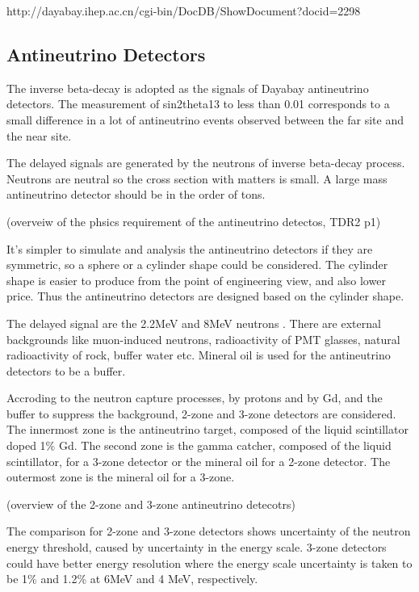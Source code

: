 http://dayabay.ihep.ac.cn/cgi-bin/DocDB/ShowDocument?docid=2298

\subsection{Antineutrino Detectors}


The inverse beta-decay is adopted as the signals of Dayabay antineutrino detectors.
The measurement of sin2theta13 to less than 0.01 corresponds to a small
difference in a lot of antineutrino events observed between the far site and
the near site.

The delayed signals are generated by the neutrons of inverse beta-decay process.
Neutrons are neutral so the cross section with matters is small.
A large mass antineutrino detector should be in the order of tons.



(overveiw of the phsics requirement of the antineutrino detectos, TDR2 p1)

It's simpler to simulate and analysis the antineutrino detectors if they are
symmetric, so a sphere or a cylinder shape could be considered. The cylinder
shape is easier to produce from the point of engineering view, and also lower
price. Thus the antineutrino detectors are designed based on the cylinder shape.

The delayed signal are the 2.2MeV and 8MeV neutrons . There are external backgrounds like
muon-induced neutrons, radioactivity of PMT glasses, natural radioactivity of rock,
buffer water etc. Mineral oil is used for the antineutrino detectors to be a buffer.

Accroding to the neutron capture processes, by protons and by Gd, and the buffer to
suppress the background, 2-zone and 3-zone detectors are considered. The innermost
zone is the antineutrino target, composed of the liquid scintillator doped 1\% Gd.
The second zone is the gamma catcher, composed of the liquid scintillator, for a
3-zone detector or the mineral oil for a 2-zone detector. The outermost zone
is the mineral oil for a 3-zone.

(overview of the 2-zone and 3-zone antineutrino detecotrs)


The comparison for 2-zone and 3-zone detectors shows 
uncertainty of the neutron energy threshold, caused by uncertainty in the energy scale.
3-zone detectors could have better energy resolution where the energy scale
uncertainty is taken to be 1\% and 1.2\% at 6MeV and 4 MeV, respectively.

